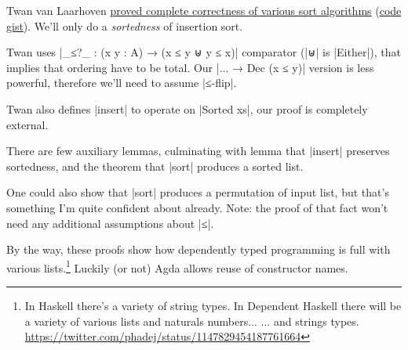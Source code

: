 Twan van Laarhoven
\href{https://www.twanvl.nl/blog/agda/sorting}{proved complete correctness of various sort algorithms}
(\href{https://gist.github.com/twanvl/5635740}{code gist}).
We'll only do a \emph{sortedness} of insertion sort.

Twan uses |_≤?_ : (x y : A) → (x ≤ y ⊎ y ≤ x)| comparator (|⊎| is |Either|),
that implies that ordering have to be total.
Our |... → Dec (x ≤ y)| version is less powerful,
therefore we'll need to assume |≤-flip|.

Twan also defines |insert| to operate on |Sorted xs|,
our proof is completely external.

There are few auxiliary lemmas, culminating with lemma
that |insert| preserves sortedness, and the theorem
that |sort| produces a sorted list.

One could also show that |sort| produces a permutation of input list,
but that's something I'm quite confident about already.
Note: the proof of that fact won't need any additional assumptions
about |≤|.

By the way, these proofs show how dependently typed programming
is full with various lists.\footnote{
In Haskell there's a variety of string types.
In Dependent Haskell there will be a variety of various lists and naturals numbers...
... and strings types. \url{https://twitter.com/phadej/status/1147829454187761664}}
Luckily (or not) Agda allows reuse of constructor names.


